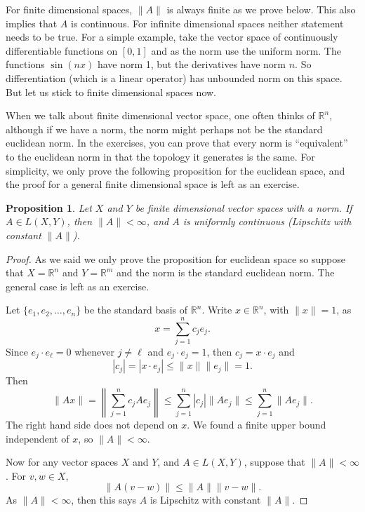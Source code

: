 \documentclass[12pt]{book}
\newcommand{\snorm}[1]{\lVert {#1} \rVert}
\newcommand{\abs}[1]{\left\lvert {#1} \right\rvert}
\newcommand{\norm}[1]{\left\lVert {#1} \right\rVert}
\newcommand{\R}{{\mathbb{R}}}
\theoremstyle{plain}
\newtheorem{prop}[thm]{Proposition}
\theoremstyle{remark}
\theoremstyle{definition}
\theoremstyle{exercise}
\theoremstyle{example}
\begin{document}
For finite dimensional spaces, $\snorm{A}$ is always finite as we prove
below.  This also implies that $A$ is continuous.
For infinite dimensional spaces neither statement needs to be true.  For a simple
example,
take the vector space of continuously differentiable functions on $[0,1]$
and as the norm use the uniform norm.  The functions
$\sin(nx)$ have norm 1, but the derivatives have norm $n$.  So
differentiation (which is a linear operator) has unbounded norm on this
space.  But let us stick to finite dimensional spaces now.

When we talk about finite dimensional vector space, one often thinks of
$\R^n$, although if we have a norm, the norm might perhaps not be
the standard euclidean norm.  In the exercises, you can prove that
every norm is ``equivalent'' to the euclidean norm in that the
topology it generates is the same.  For simplicity, we only prove the
following proposition for the euclidean space, and the proof for a general
finite dimensional space is left as an exercise.


\begin{prop} \label{prop:finitedimpropnormfin}
Let $X$ and $Y$ be finite dimensional vector spaces with a norm.
If $A \in L(X,Y)$, then $\snorm{A} < \infty$, and
$A$ is uniformly continuous (Lipschitz with constant $\snorm{A}$).
\end{prop}

\begin{proof}
As we said we only prove the proposition for euclidean space so suppose
that $X = \R^n$ and $Y=\R^m$ and the norm is the standard euclidean norm.
The general case is left as an exercise.

Let $\{ e_1,e_2,\ldots,e_n \}$ be the standard basis of $\R^n$.
Write $x \in \R^n$, with $\snorm{x} = 1$, as
\begin{equation*}
x = \sum_{j=1}^n c_j e_j .
\end{equation*}
Since $e_j \cdot e_\ell = 0$ whenever $j\not=\ell$ and $e_j \cdot e_j = 1$,
then $c_j = x \cdot e_j$ and
\begin{equation*}
\abs{c_j} = \abs{ x \cdot e_j }
\leq \snorm{x} \snorm{e_j} = 1 .
\end{equation*}
Then
\begin{equation*}
\snorm{Ax} =
\norm{\sum_{j=1}^n c_j Ae_j}
\leq
\sum_{j=1}^n \abs{c_j} \snorm{Ae_j} 
\leq
\sum_{j=1}^n \snorm{Ae_j} .
\end{equation*}
The right hand side does not depend on $x$.  We found
a finite upper bound independent of $x$, so $\snorm{A} < \infty$.

Now for any vector spaces $X$ and $Y$, and $A \in L(X,Y)$, suppose that
$\snorm{A} < \infty$.
For $v,w \in X$,
\begin{equation*}
\snorm{A(v-w)} \leq \snorm{A} \snorm{v-w} .
\end{equation*}
As $\snorm{A} < \infty$, then this says $A$ is Lipschitz with constant $\snorm{A}$.
\end{proof}
\end{document}
